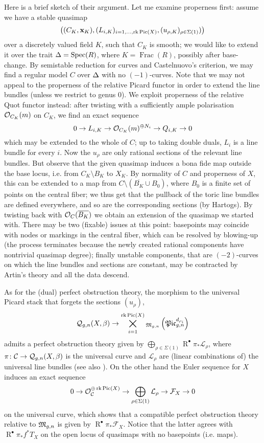Here is a brief sketch of their argument. Let me examine properness first: assume we have a stable quasimap \[\left((C_K,\mathbf x_K), (L_{i,K})_{i=1,\ldots,\operatorname{rk}\operatorname{Pic}(X)},(u_{\rho,K})_{\rho\in\Sigma(1)})\right)\] over a discretely valued field $K$, such that $C_K$ is smooth; we would like to extend it over the trait $\Delta=\operatorname{Spec}(R)$, where $K=\operatorname{Frac}(R)$, possibly after base-change. By semistable reduction for curves and Castelnuovo's criterion, we may find a regular model $C$ over $\Delta$ with no $(-1)$-curves. Note that we may not appeal to the properness of the relative Picard functor in order to extend the line bundles (unless we restrict to genus $0$). We exploit properness of the relative Quot functor instead: after twisting with a sufficiently ample polarisation $\mathcal{O}_{C_K}(m)$ on $C_K$, we find an exact sequence
\[ 0 \rightarrow L_{i,K} \rightarrow \mathcal{O}_{C_K}(m)^{\oplus N_i} \rightarrow Q_{i,K}\rightarrow 0 \]
which may be extended to the whole of $C$; up to taking double duals, $L_i$ is a line bundle for every $i$. Now the $u_\rho$ are only rational sections of the relevant line bundles. But observe that the given quasimap induces a bona fide map outside the base locus, i.e. from $C_K\setminus B_K$ to $X_K$. By normality of $C$ and properness of $X$, this can be extended to a map from $C\setminus(\overline{B_K}\cup B_0)$, where $B_0$ is a finite set of points on the central fiber; we thus get that the pullback of the toric line bundles are defined everywhere, and so are the corresponding sections (by Hartogs). By twisting back with $\mathcal{O}_C(\overline{B_K})$ we obtain an extension of the quasimap we started with. There may be two (fixable) issues at this point: basepoints may coincide with nodes or markings in the central fiber, which can be resolved by blowing-up (the process terminates because the newly created rational components have nontrivial quasimap degree); finally unstable components, that are $(-2)$-curves on which the line bundles and sections are constant, may be contracted by Artin's theory and all the data descend.

As for the (dual) perfect obstruction theory, the morphism to the universal Picard stack that forgets the sections $(u_\rho)$,
\[\mathcal{Q}_{g,n}(X,\beta) \rightarrow \bigtimes_{i=1}^{\operatorname{rk}\operatorname{Pic}(X)}{}_{\mathfrak M_{g,n}}\left(\mathfrak{Pic}^{d_{\rho_i}}_{g,n}\right)\]
admits a perfect obstruction theory given by $\bigoplus_{\rho\in\Sigma(1)} \operatorname R^\bullet\pi_*\mathcal L_\rho$, where $\pi\colon \mathcal C\rightarrow \mathcal{Q}_{g,n}(X,\beta)$ is the universal curve and $\mathcal L_\rho$ are (linear combinations of) the universal line bundles (see also \cites{Jie, CL-pfields}). On the other hand the Euler sequence for $X$ induces an exact sequence
\[ 0\rightarrow \mathcal{O}_{\mathcal C}^{\oplus\operatorname{rk}\operatorname{Pic}(X)}\rightarrow \bigoplus_{\rho\in\Sigma(1)}\mathcal L_\rho\rightarrow\mathcal F_X\rightarrow 0\]
on the universal curve, which shows that a compatible perfect obstruction theory relative to $\mathfrak M_{g,n}$ is given by $\operatorname R^\bullet\pi_*\mathcal F_X$. Notice that the latter agrees with $\operatorname R^\bullet\pi_*f^*T_X$ on the open locus of quasimaps with no basepoints (i.e. maps).

